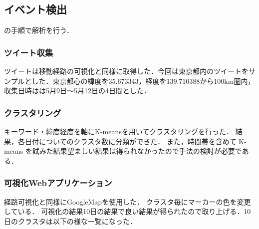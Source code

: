 \subsection{イベント検出}
の手順で解析を行う．

\subsubsection{ツイート収集}
ツイートは移動経路の可視化と同様に取得した．今回は東京都内のツイートをサンプルとした．東京都心の緯度を35.673343，経度を139.710388から100km圏内，収集日時はは5月9日〜5月12日の4日間とした．

\subsubsection{クラスタリング}
キーワード・緯度経度を軸にK-meansを用いてクラスタリングを行った．
結果，各日付についてのクラスタ数に分類ができた．
また，時間帯を含めて K-means を試みた結果望ましい結果は得られなかったので手法の検討が必要である．


\subsubsection{可視化Webアプリケーション}
経路可視化と同様にGoogleMapを使用した． クラスタ毎にマーカーの色を変更している．
可視化の結果10日の結果で良い結果が得られたので取り上げる．10日のクラスタは以下の様な一覧になった．



